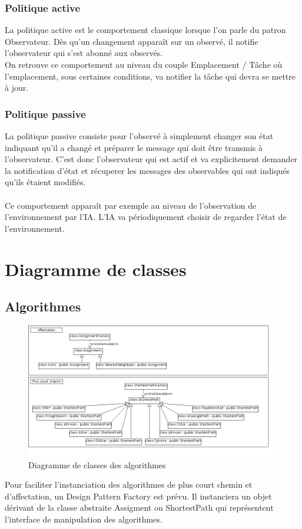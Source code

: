 \subsubsection{Politique active}

La politique active est le comportement classique lorsque l'on parle du patron Observateur. Dès qu'un changement apparaît sur un observé, il notifie l'observateur qui s'est abonné aux observés.\\
On retrouve ce comportement au niveau du couple Emplacement / Tâche où l'emplacement, sous certaines conditions, va notifier la tâche qui devra se mettre à jour.

\subsubsection{Politique passive}

La politique passive consiste pour l'observé à simplement changer son état indiquant qu'il a changé et préparer le message qui doit être transmis à l'observateur. C'est donc l'observateur qui est actif et va explicitement demander la notification d'état et récuperer les messages des observables qui ont indiqués qu'ils étaient modifiés.\\\\
Ce comportement apparaît par exemple au niveau de l'observation de l'environnement par l'IA. L'IA va périodiquement choisir de regarder l'état de l'environnement.

\section{Diagramme de classes}
\subsection{Algorithmes}
\begin{figure}[!h]\centering
   \includegraphics[scale=0.5]{images/c_algo.png}
   \caption{\label{c_algo} Diagramme de classes des algorithmes}
\end{figure}
Pour faciliter l'instanciation des algorithmes de plus court chemin et d'affectation, un Design Pattern Factory est prévu. Il instanciera un objet dérivant de la classe abstraite Assigment ou ShortestPath qui représentent l'interface de manipulation des algorithmes.

